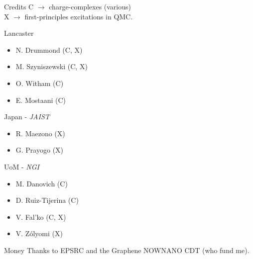 \documentclass[12pt, pdf, hyperref={draft}, usenames, dvipsnames]{beamer}
\begin{document}
\begin{frame}{Credits}
C $\rightarrow$ charge-complexes (various) \\
X $\rightarrow$ first-principles excitations in QMC\@.
\begin{minipage}[t]{0.45\textwidth}
\begin{block}{Lancaster}
\begin{itemize}
  \item N. Drummond (C, X)
  \item M. Szyniszewski (C, X)
  \item O. Witham (C)
  \item E. Mostaani (C)
\end{itemize}
\end{block}

\begin{block}{Japan - \textit{JAIST}}
\begin{itemize}
  \item R. Maezono (X)
  \item G. Prayogo (X)
\end{itemize}
\end{block}

\end{minipage}%
\hfill
\begin{minipage}[t]{0.45\textwidth}
\begin{block}{UoM - \textit{NGI} }
\begin{itemize}
  \item M. Danovich (C)
  \item D. Ruiz-Tijerina (C)
  \item V. Fal'ko (C, X)
  \item V. Z\'{o}lyomi (X)
\end{itemize}
\end{block}

\begin{block}{Money}
Thanks to EPSRC and the Graphene NOWNANO CDT (who fund me).
\end{block}


\end{minipage}%
\end{frame}
\end{document}
